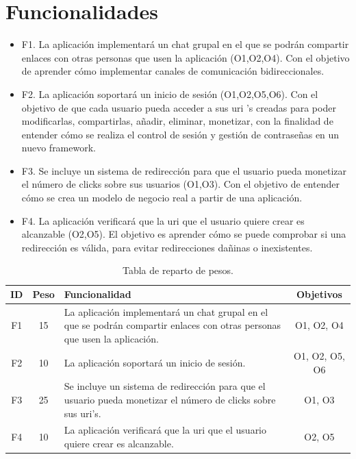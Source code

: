 \documentclass{article}
\begin{document}
\section*{Funcionalidades}
 
\begin{itemize}
    \item F1. La aplicación implementará un chat grupal en el que se podrán compartir enlaces con otras personas que usen la aplicación (O1,O2,O4). Con el objetivo de aprender cómo implementar canales de comunicación bidireccionales.
    \item F2. La aplicación soportará un inicio de sesión (O1,O2,O5,O6). Con el objetivo de que cada usuario pueda acceder a sus uri 's creadas para poder modificarlas, compartirlas, añadir, eliminar, monetizar, con la finalidad de entender cómo se realiza el control de sesión y gestión de contraseñas en un nuevo framework.
    \item F3. Se incluye un sistema de redirección para que el usuario pueda monetizar el número de clicks sobre sus usuarios (O1,O3). Con el objetivo de entender cómo se crea un modelo de negocio real a partir de una aplicación.
    \item F4. La aplicación verificará que la uri que el usuario quiere crear es alcanzable (O2,O5). El objetivo es aprender cómo se puede comprobar si una redirección es válida, para evitar redirecciones dañinas o inexistentes.
\end{itemize}
 
\begin{table}[hbtp]
    \footnotesize
    \centering
    \settowidth{}
    \setlength\extrarowheight{5pt}
    \begin{tabulary}{\textwidth}{ C C L C}
        \textbf{ID} & 
        \textbf{Peso} & 
        \textbf{Funcionalidad} & 
        \textbf{Objetivos}\\
    \hline
    \hline
        F1 & 
        15 & 
        La aplicación implementará un chat grupal en el que se podrán compartir enlaces con otras personas que usen la aplicación. &
        O1, O2, O4\\
    \hline  
        F2 &
        10 &
        La aplicación soportará un inicio de sesión. &
        O1, O2, O5, O6\\
    \hline
        F3 &
        25 &
        Se incluye un sistema de redirección para que el usuario pueda monetizar el número de clicks sobre sus uri's. &
        O1, O3\\
    \hline
        F4 &
        10 &
        La aplicación verificará que la uri que el usuario quiere crear es alcanzable. &
        O2, O5
 
    \end{tabulary}
    \caption{Tabla de reparto de pesos.}
\end{table}
 
\end{document}
